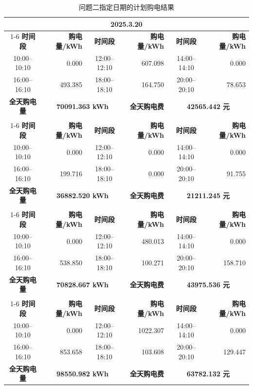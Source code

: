 \begin{table}[H]
\centering\small
\caption{问题二指定日期的计划购电结果}\label{tab:q2-specified-plan}
\renewcommand{\arraystretch}{0.82}
\begin{tabular*}{\textwidth}{@{\extracolsep{\fill}}crcrcr@{}}
\toprule
\multicolumn{6}{c}{\textbf{2025.3.20}} \\
\cmidrule(lr){1-6}
\textbf{时间段} & \textbf{购电量/kWh} & \textbf{时间段} & \textbf{购电量/kWh} & \textbf{时间段} & \textbf{购电量/kWh} \\
10:00--10:10 & 0.000 & 12:00--12:10 & 607.098 & 14:00--14:10 & 0.000 \\
16:00--16:10 & 493.385 & 18:00--18:10 & 164.750 & 20:00--20:10 & 78.653 \\
\midrule
\textbf{全天购电量} & \multicolumn{2}{c}{\textbf{70091.363 kWh}} & \textbf{全天购电费} & \multicolumn{2}{c}{\textbf{42565.442 元}} \\
\addlinespace[4pt]
\multicolumn{6}{c}{\textbf{2025.6.21}} \\
\cmidrule(lr){1-6}
\textbf{时间段} & \textbf{购电量/kWh} & \textbf{时间段} & \textbf{购电量/kWh} & \textbf{时间段} & \textbf{购电量/kWh} \\
10:00--10:10 & 0.000 & 12:00--12:10 & 0.000 & 14:00--14:10 & 0.000 \\
16:00--16:10 & 199.716 & 18:00--18:10 & 0.000 & 20:00--20:10 & 91.755 \\
\midrule
\textbf{全天购电量} & \multicolumn{2}{c}{\textbf{36882.520 kWh}} & \textbf{全天购电费} & \multicolumn{2}{c}{\textbf{21211.245 元}} \\
\addlinespace[4pt]
\multicolumn{6}{c}{\textbf{2025.9.23}} \\
\cmidrule(lr){1-6}
\textbf{时间段} & \textbf{购电量/kWh} & \textbf{时间段} & \textbf{购电量/kWh} & \textbf{时间段} & \textbf{购电量/kWh} \\
10:00--10:10 & 0.000 & 12:00--12:10 & 480.013 & 14:00--14:10 & 0.000 \\
16:00--16:10 & 538.850 & 18:00--18:10 & 100.271 & 20:00--20:10 & 158.710 \\
\midrule
\textbf{全天购电量} & \multicolumn{2}{c}{\textbf{70828.667 kWh}} & \textbf{全天购电费} & \multicolumn{2}{c}{\textbf{43975.536 元}} \\
\addlinespace[4pt]
\multicolumn{6}{c}{\textbf{2025.12.21}} \\
\cmidrule(lr){1-6}
\textbf{时间段} & \textbf{购电量/kWh} & \textbf{时间段} & \textbf{购电量/kWh} & \textbf{时间段} & \textbf{购电量/kWh} \\
10:00--10:10 & 0.000 & 12:00--12:10 & 1022.307 & 14:00--14:10 & 0.000 \\
16:00--16:10 & 853.658 & 18:00--18:10 & 103.608 & 20:00--20:10 & 129.447 \\
\midrule
\textbf{全天购电量} & \multicolumn{2}{c}{\textbf{98550.982 kWh}} & \textbf{全天购电费} & \multicolumn{2}{c}{\textbf{63782.132 元}} \\
\bottomrule
\end{tabular*}
\end{table}

